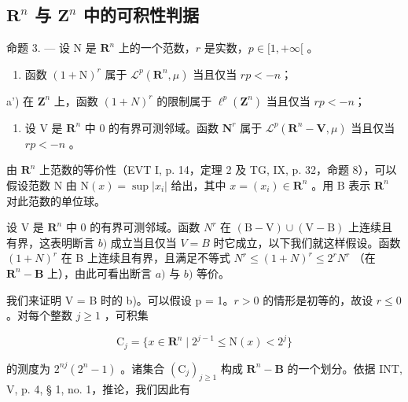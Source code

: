 \subsection{\texorpdfstring{\(\mathbf{R}^{n}\) 与 \(\mathbf{Z}^{n}\) 中的可积性判据}{\textbackslash mathbf\{R\}\^{}\{n\} 与 \textbackslash mathbf\{Z\}\^{}\{n\} 中的可积性判据}}

命题 3. --- 设 N 是 \(\mathbf{R}^{n}\) 上的一个范数，\(r\) 是实数，\(p \in [1, +\infty[\) 。

\begin{enumerate}
\def\labelenumi{\alph{enumi})}
\tightlist
\item
  函数 \((1 + \mathrm{N})^{r}\) 属于 \(\mathcal{L}^{p}(\mathbf{R}^{n}, \mu)\) 当且仅当 \(rp < -n\)；
\end{enumerate}

a') 在 \(\mathbf{Z}^{n}\) 上，函数 \((1+N)^{r}\) 的限制属于 \(\ell^{p}(\mathbf{Z}^{n})\) 当且仅当 \(rp < -n\)；

\begin{enumerate}
\def\labelenumi{\alph{enumi})}
\setcounter{enumi}{1}
\tightlist
\item
  设 V 是 \(\mathbf{R}^{n}\) 中 0 的有界可测邻域。函数 \(\mathbf{N}^{r}\) 属于 \(\mathcal{L}^{p}(\mathbf{R}^{n}-\mathbf{V},\mu)\) 当且仅当 \(rp<-n\) 。
\end{enumerate}

由 \(\mathbf{R}^{n}\) 上范数的等价性（EVT I, p. 14，定理 2 及 TG, IX, p. 32，命题 8），可以假设范数 N 由 \(\mathrm{N}(x)=\sup|x_{i}|\) 给出，其中 \(x=(x_{i})\in\mathbf{R}^{n}\) 。用 B 表示 \(\mathbf{R}^{n}\) 对此范数的单位球。

设 V 是 \(\mathbf{R}^n\) 中 0 的有界可测邻域。函数 \(N^r\) 在 \((\mathrm{B - V})\cup (\mathrm{V - B})\) 上连续且有界，这表明断言 \(b)\) 成立当且仅当 \(V = B\) 时它成立，以下我们就这样假设。函数 \((1 + N)^r\) 在 B 上连续且有界，且满足不等式 \(N^r\leqslant (1 + N)^r\leqslant 2^r N^r\) （在 \(\mathbf{R}^n -\mathbf{B}\) 上），由此可看出断言 \(a)\) 与 \(b)\) 等价。

我们来证明 V = B 时的 b)。可以假设 p = 1。\(r > 0\) 的情形是初等的，故设 \(r \leqslant 0\) 。对每个整数 \(j \geqslant 1\) ，可积集

\[
\mathrm{C} _ {j} = \{x \in \mathbf {R} ^ {n} \mid 2 ^ {j - 1} \leqslant \mathrm{N} (x) <   2 ^ {j} \}
\]

的测度为 \(2^{nj}(2^n - 1)\) 。诸集合 \((\mathrm{C}_j)_{j \geqslant 1}\) 构成 \(\mathbf{R}^n - \mathbf{B}\) 的一个划分。依据 INT, V, p. 4, § 1, no. 1，推论，我们因此有

